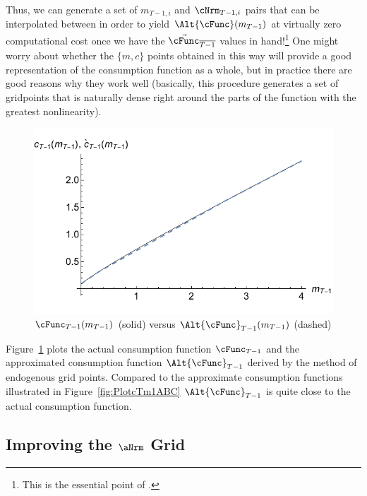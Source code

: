 \documentclass[titlepage, headings=optiontotocandhead]{\econtex}
\begin{document}
Thus, we can generate a set of ${m}_{T-1,i}$ and ${\cNrm}_{T-1,i}$
pairs that can be interpolated between in order to yield
$\Alt{\cFunc}({m}_{T-1})$ at virtually zero computational cost once we
have the $\vec{\cFunc}_{\overline{T-1}}$ values in hand!\footnote{This is
  the essential point of \cite{carrollEGM}.} One might worry
about whether the $\{{m},{c}\}$ points obtained in this way will provide a
good representation of the consumption function as a whole, but in
practice there are good reasons why they work well (basically, this
procedure generates a set of gridpoints that is naturally dense right
around the parts of the function with the greatest nonlinearity).
\hypertarget{PlotComparecTm1AD}{}
\begin{figure}
  \includegraphics{./Figures/PlotComparecTm1AD}
  \caption{$\cFunc_{T-1}({m}_{T-1})$ (solid) versus $\Alt{\cFunc}_{T-1}({m}_{T-1})$ (dashed)}
  \label{fig:ComparecTm1AD}
\end{figure}
Figure~\ref{fig:ComparecTm1AD} plots the actual consumption function
${\cFunc}_{T-1}$ and the approximated consumption function $\Alt{\cFunc}_{T-1}$
derived by the method of endogenous grid points. Compared to the approximate consumption
functions illustrated in Figure~\ref{fig:PlotcTm1ABC} $\Alt{\cFunc}_{T-1}$ is quite close
to the actual consumption function.



\hypertarget{Improving-the-a-Grid}{}
\subsection{Improving the $\aNrm$ Grid}
\end{document}
